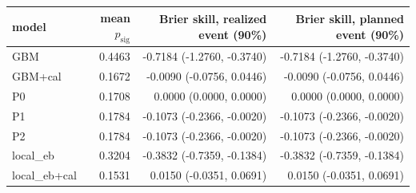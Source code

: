 \begin{tabular}{lrrr}
\toprule
model & mean $p_{\mathrm{sig}}$ & Brier skill, realized event (90\%) & Brier skill, planned event (90\%) \\
\midrule
GBM & 0.4463 & -0.7184 (-1.2760, -0.3740) & -0.7184 (-1.2760, -0.3740) \\
GBM+cal & 0.1672 & -0.0090 (-0.0756, 0.0446) & -0.0090 (-0.0756, 0.0446) \\
P0 & 0.1708 & 0.0000 (0.0000, 0.0000) & 0.0000 (0.0000, 0.0000) \\
P1 & 0.1784 & -0.1073 (-0.2366, -0.0020) & -0.1073 (-0.2366, -0.0020) \\
P2 & 0.1784 & -0.1073 (-0.2366, -0.0020) & -0.1073 (-0.2366, -0.0020) \\
local\_eb & 0.3204 & -0.3832 (-0.7359, -0.1384) & -0.3832 (-0.7359, -0.1384) \\
local\_eb+cal & 0.1531 & 0.0150 (-0.0351, 0.0691) & 0.0150 (-0.0351, 0.0691) \\
\bottomrule
\end{tabular}
